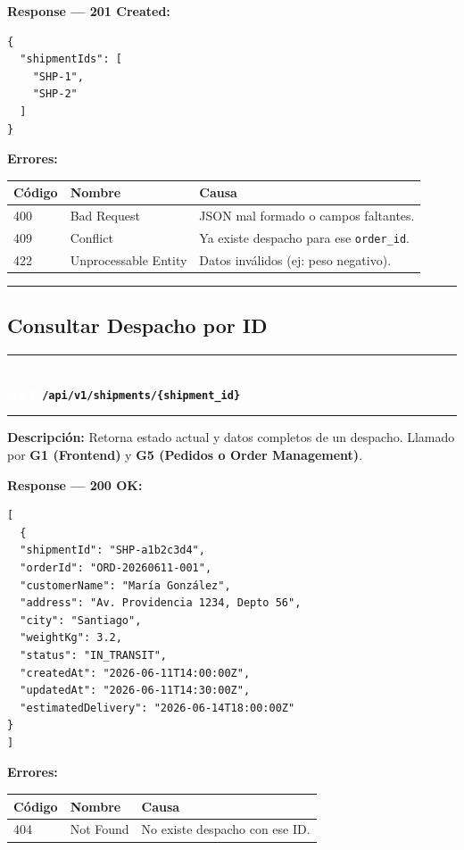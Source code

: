 \documentclass[11pt, a4paper]{article}
\newcommand{\httpmethod}[2]{%
  \colorbox{#1}{\textcolor{white}{\textbf{\small\textsf{#2}}}}%
}
\newcommand{\routeheader}[3]{%
  \noindent\rule{\textwidth}{1.5pt}\\[0.3em]
  \httpmethod{#1}{#2}\;\texttt{\bfseries #3}\\[0.3em]
  \rule{\textwidth}{0.4pt}
  \vspace{0.3cm}
}
\begin{document}
\textbf{Response --- 201 Created:}

\begin{lstlisting}
{
  "shipmentIds": [
    "SHP-1",
    "SHP-2"
  ]
}
\end{lstlisting}

\textbf{Errores:}
\begin{table}[ht!]
\small
\begin{tabularx}{\textwidth}{l l X}
  \toprule
  \textbf{Código} & \textbf{Nombre} & \textbf{Causa} \\
  \midrule
  400 & Bad Request          & JSON mal formado o campos faltantes. \\
  409 & Conflict             & Ya existe despacho para ese \texttt{order\_id}. \\
  422 & Unprocessable Entity & Datos inválidos (ej: peso negativo). \\
  \bottomrule
\end{tabularx}
\end{table}

\noindent\rule{\textwidth}{0.4pt}




\subsection{Consultar Despacho por ID}

\routeheader{get}{GET}{/api/v1/shipments/\{shipment\_id\}}

\textbf{Descripción:} Retorna estado actual y datos completos de un despacho.
Llamado por \textbf{G1 (Frontend)} y \textbf{G5 (Pedidos o Order Management)}.

\vspace{0.3cm}
\textbf{Response --- 200 OK:}

\begin{lstlisting}
[
  {
  "shipmentId": "SHP-a1b2c3d4",
  "orderId": "ORD-20260611-001",
  "customerName": "María González",
  "address": "Av. Providencia 1234, Depto 56",
  "city": "Santiago",
  "weightKg": 3.2,
  "status": "IN_TRANSIT",
  "createdAt": "2026-06-11T14:00:00Z",
  "updatedAt": "2026-06-11T14:30:00Z",
  "estimatedDelivery": "2026-06-14T18:00:00Z"
}
]
\end{lstlisting}

\textbf{Errores:}
\begin{table}[ht!]
\small
\begin{tabularx}{\textwidth}{l l X}
  \toprule
  \textbf{Código} & \textbf{Nombre} & \textbf{Causa} \\
  \midrule
  404 & Not Found & No existe despacho con ese ID. \\
  \bottomrule
\end{tabularx}
\end{table}
\end{document}
